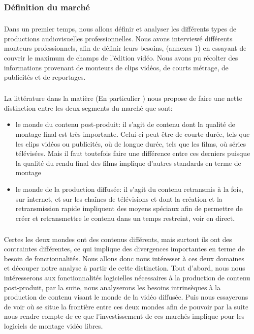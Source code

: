\subsubsection{Définition du marché}

\subparagraph{}
Dans un premier temps, nous allons définir et analyser les
différents types de productions audiovisuelles professionnelles.
Nous avons interviewé
différents monteurs professionnels, afin de définir leurs besoins,
(annexes 1) en essayant de
couvrir le maximum de champs de l'édition vidéo. Nous
avons pu récolter des informations provenant de monteurs de clips
vidéos, de courts métrage, de publicités et de reportages.

\subparagraph{}
La littérature dans la matière (En particulier \cite{WorldVideoNonlinearEditingMarket})
nous propose de faire une nette distinction entre  les deux segments du marché que sont:
\begin{itemize}
  \item {le monde du contenu post-produit: il s'agit de contenu dont la qualité de
    montage final est très importante. Celui-ci peut être de courte durée, tels que les clips
    vidéos ou publicités, où de longue durée, tels que les films, où séries télévisées. Mais
    il faut toutefois faire une différence entre ces derniers puisque la qualité du
    rendu final des films implique d'autres standards en terme de montage}
  \item {le monde de la production diffusée: il s'agit du contenu retransmis à la fois,
    sur internet, et sur les chaînes de télévisions et dont la création et la retransmission
    rapide impliquent des moyens spéciaux afin de permettre de créer et retransmettre
    le contenu dans un temps restreint, voir en direct.}
\end{itemize}

\subparagraph{}
Certes les deux mondes ont des contenus différents, mais surtout ils ont des contraintes différentes,
ce qui implique des divergences importantes en terme de besoin de fonctionnalités. Nous allons donc
nous intéresser à ces deux domaines et découper notre analyse à partir de cette distinction. Tout
d'abord, nous nous intéresserons aux fonctionnalités logicielles nécessaires à la production
de contenu post-produit, par la suite, nous analyserons les besoins intrinsèques à la production de contenu
visant le monde de la vidéo diffusée. Puis nous essayerons de voir où se situe la frontière entre ces
deux mondes afin de pouvoir par la suite nous rendre compte de ce que l'investissement de ces marchés
implique pour les logiciels de montage vidéo libres.

